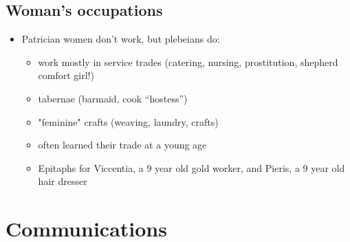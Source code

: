 \documentclass[12pt, twoside]{article}
\begin{document}
\begin{itemize}
\subsection{Woman's occupations}
\begin{itemize}
\item Patrician women don’t work, but plebeians do:
	\begin{itemize}
	\item work mostly in service trades (catering, nursing, prostitution, shepherd comfort girl!)
	\item tabernae (barmaid, cook “hostess”)
	\item "feminine" crafts (weaving, laundry, crafts)
	\item often learned their trade at a young age
	\item Epitaphs for Viccentia, a 9 year old gold worker, and Pieris, a 9 year old hair dresser
	\end{itemize}
\end{itemize}

\section{Communications}

\end{itemize}
\end{document}
